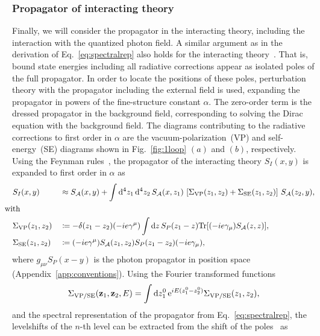 \subsubsection*{Propagator of interacting theory}
Finally, we will consider the propagator in the interacting theory, including the interaction with the quantized photon field. A similar argument as in the derivation of Eq.~\eqref{eq:spectralrep} also holds for the interacting theory~\cite[Section 14.2.]{weinberg2005}. That is, bound state energies including all radiative corrections appear as isolated poles of the full propagator. In order to locate the positions of these poles, perturbation theory with the propagator including the external field is used, expanding the propagator in powers of the fine-structure constant $\alpha$. The zero-order term is the dressed propagator in the background field, corresponding to solving the Dirac equation with the background field. The diagrams contributing to the radiative corrections to first order in $\alpha$ are the vacuum-polarization~(VP) and self-energy~(SE) diagrams shown in Fig.~\ref{fig:1loop} $(a)$ and $(b)$, respectively. Using the Feynman rules~\mbox{\cite[Section 6.1.]{itzykson2005}}, the propagator of the interacting theory $S_{I}(x,y)$ is expanded to first order in $\alpha$ as
\begin{alignat}{2}
&S_{I}(x,y) &&\approx S_{\mathcal{A}}(x,y) + \int \mathrm{d}^4z_1\,\mathrm{d}^4z_2\,
S_{\mathcal{A}}(x,z_1)\,\left[\Sigma_{\text{VP}}(z_1,z_2)+\Sigma_{\text{SE}}(z_1,z_2)\right]\,S_{\mathcal{A}}(z_2,y),\notag\\
&\hspace{-0.35cm}\text{with }&&\notag\\
&\Sigma_{\text{VP}}(z_1,z_2)&&\coloneqq-\delta(z_1-z_2)(-ie\gamma^\mu)\int \text{d}z\,S_P(z_1-z)\Tr [(-ie\gamma_\mu)S_{\mathcal{A}}(z,z)],\notag\\
&\Sigma_{\text{SE}}(z_1,z_2)&&\coloneqq(-ie\gamma^\mu)S_{\mathcal{A}}(z_1,z_2)S_P(z_1-z_2)(-ie\gamma_\mu),
\end{alignat}
where $g_{\mu\nu}S_P(x-y)$ is the photon propagator in position space (Appendix~\ref{app:conventions}). Using the Fourier transformed functions
\begin{equation}
\Sigma_{\text{VP/SE}}(\mathbf{z}_1,\mathbf{z}_2,E)= \int \text{d}z_1^0\, \text{e}^{iE(z_1^0-z_2^0)}\Sigma_{\text{VP/SE}}(z_1,z_2),
\end{equation}
and the spectral representation of the propagator from Eq.~\eqref{eq:spectralrep}, the levelshifts of the $n$-th level can be extracted from the shift of the poles~\mbox{\cite[Section 14.2.]{weinberg2005}} as
